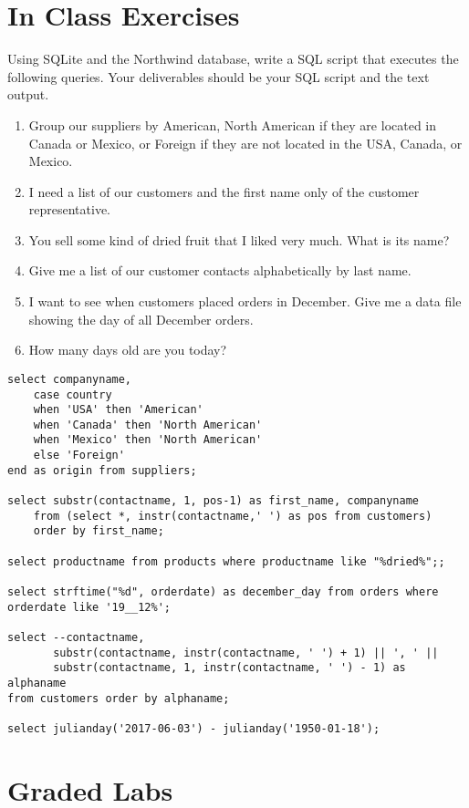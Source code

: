 \documentclass{article}
\begin{document}
    \section{In Class Exercises}

Using SQLite and the Northwind database, write a SQL script that executes the following queries. Your deliverables should be your SQL script and the text output.

    \begin{enumerate}
\item Group our suppliers by American, North American if they are located in Canada or Mexico, or Foreign if they are not located in the USA, Canada, or Mexico.
\item I need a list of our customers and the first name only of the customer representative.
\item You sell some kind of dried fruit that I liked very much. What is its name?
\item Give me a list of our customer contacts alphabetically by last name. 
\item I want to see when customers placed orders in December. Give me a data file showing the day of all December orders.
\item How many days old are you today?
    \end{enumerate}

    \begin{lstlisting}
select companyname, 
    case country 
    when 'USA' then 'American'
    when 'Canada' then 'North American'
    when 'Mexico' then 'North American'
    else 'Foreign' 
end as origin from suppliers;
    
select substr(contactname, 1, pos-1) as first_name, companyname
    from (select *, instr(contactname,' ') as pos from customers)
    order by first_name;

select productname from products where productname like "%dried%";;

select strftime("%d", orderdate) as december_day from orders where orderdate like '19__12%';

select --contactname, 
       substr(contactname, instr(contactname, ' ') + 1) || ', ' ||
       substr(contactname, 1, instr(contactname, ' ') - 1) as alphaname
from customers order by alphaname;

select julianday('2017-06-03') - julianday('1950-01-18');
    \end{lstlisting}


    \section{Graded Labs}
\end{document}
